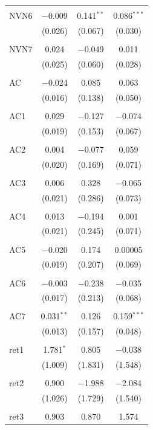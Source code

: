 \begin{table}[!htbp]
\begin{tabular}{@{\extracolsep{5pt}}lccc}
  & & & \\ 
 NVN6 & $-$0.009 & 0.141$^{**}$ & 0.086$^{***}$ \\ 
  & (0.026) & (0.067) & (0.030) \\ 
  & & & \\ 
 NVN7 & 0.024 & $-$0.049 & 0.011 \\ 
  & (0.025) & (0.060) & (0.028) \\ 
  & & & \\ 
 AC & $-$0.024 & 0.085 & 0.063 \\ 
  & (0.016) & (0.138) & (0.050) \\ 
  & & & \\ 
 AC1 & 0.029 & $-$0.127 & $-$0.074 \\ 
  & (0.019) & (0.153) & (0.067) \\ 
  & & & \\ 
 AC2 & 0.004 & $-$0.077 & 0.059 \\ 
  & (0.020) & (0.169) & (0.071) \\ 
  & & & \\ 
 AC3 & 0.006 & 0.328 & $-$0.065 \\ 
  & (0.021) & (0.286) & (0.073) \\ 
  & & & \\ 
 AC4 & 0.013 & $-$0.194 & 0.001 \\ 
  & (0.021) & (0.245) & (0.071) \\ 
  & & & \\ 
 AC5 & $-$0.020 & 0.174 & 0.00005 \\ 
  & (0.019) & (0.207) & (0.069) \\ 
  & & & \\ 
 AC6 & $-$0.003 & $-$0.238 & $-$0.035 \\ 
  & (0.017) & (0.213) & (0.068) \\ 
  & & & \\ 
 AC7 & 0.031$^{**}$ & 0.126 & 0.159$^{***}$ \\ 
  & (0.013) & (0.157) & (0.048) \\ 
  & & & \\ 
 ret1 & 1.781$^{*}$ & 0.805 & $-$0.038 \\ 
  & (1.009) & (1.831) & (1.548) \\ 
  & & & \\ 
 ret2 & 0.900 & $-$1.988 & $-$2.084 \\ 
  & (1.026) & (1.729) & (1.540) \\ 
  & & & \\ 
 ret3 & 0.903 & 0.870 & 1.574 \\ 

\end{tabular}
\end{table}
